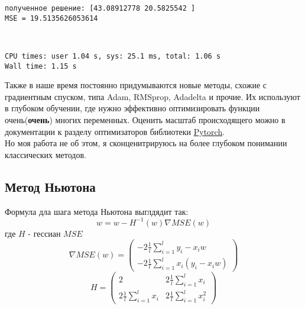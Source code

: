 \documentclass[11pt]{article}
\begin{document}
    \begin{Verbatim}[commandchars=\\\{\}]
полученное решение: [43.08912778 20.5825542 ]
MSE = 19.5135626053614
    \end{Verbatim}

    \begin{center}
    \end{center}
    { \hspace*{\fill} \\}
    
    \begin{Verbatim}[commandchars=\\\{\}]
CPU times: user 1.04 s, sys: 25.1 ms, total: 1.06 s
Wall time: 1.15 s
    \end{Verbatim}

    Также в наше время постоянно придумываются новые методы, схожие с
градиентным спуском, типа Adam, RMSprop, Adadelta и прочие. Их
используют в глубоком обучении, где нужно эффективно оптимизировать
функции очень(\textbf{очень}) многих переменных. Оценить масштаб
происходящего можно в документации к разделу оптимизаторов библиотеки
\href{https://pytorch.org/docs/stable/optim.html}{Pytorch}.\\
Но моя работа не об этом, я сконценитрируюсь на более глубоком понимании
классических методов.

    \hypertarget{ux43cux435ux442ux43eux434-ux43dux44cux44eux442ux43eux43dux430}{%
\subsection{Метод
Ньютона}\label{ux43cux435ux442ux43eux434-ux43dux44cux44eux442ux43eux43dux430}}

Формула дла шага метода Ньютона выглдядит так: \[
w = w - H^{-1}(w)\nabla MSE(w)
\] где \(H\) - гессиан \(MSE\) \[
\nabla MSE(w) = \begin{pmatrix}
 -2 \frac{1}{l} \sum_{i=1}^l y_i - x_iw \\
 -2 \frac{1}{l} \sum_{i=1}^l x_i(y_i - x_iw) 
  \end{pmatrix}
\] \[
H = \begin{pmatrix}
2 & 2 \frac{1}{l} \sum_{i=1}^l  x_i \\
2 \frac{1}{l} \sum_{i=1}^l  x_i & 2 \frac{1}{l} \sum_{i=1}^l  x_i^2
\end{pmatrix}
\]
\end{document}
